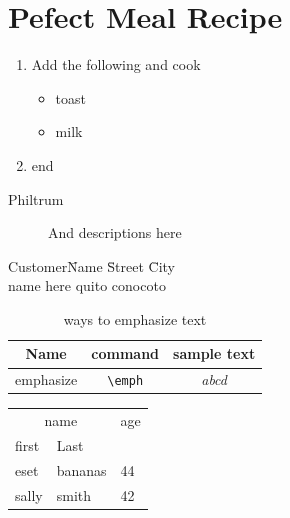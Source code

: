 \documentclass[a4paper,12pt]{book}
\begin{document}
\newpage
    \section {Pefect Meal Recipe}
    \begin{enumerate}[label= \arabic*,font=\bfseries]
        \item Add the following and cook
        \begin{itemize}
            \item toast
            \item milk
        \end{itemize}
        \item end
    \end{enumerate}
    \bigskip

    \begin{description}
        \item[Philtrum] And descriptions here
    \end{description}

    \begin{tabbing}
        Customer\=Name \hspace*{1.5 cm}\= Street \hspace*{1.5cm} \= City \\
        \>name here \> quito \> conocoto \\
    \end{tabbing}


\begin{table}
    \begin{tabular}{c|c|c}
        \textbf{Name}&\textbf{command}&\textbf{sample text}\\
        \hline
        emphasize&\verb|\emph| & \emph{abcd}\\
        
    \end{tabular}
    \caption{ways to emphasize text} \label{sec:typeemp}
\end{table}

\begin{tabular}{@{}*3l@{}}
    \multicolumn{2}{c}{name} &
    \multicolumn{1}{c}{age}\\
    first & Last & \\
    \hline
    eset & bananas & 44\\
    sally & smith & 42 \\
    
\end{tabular}\\
\end{document}
